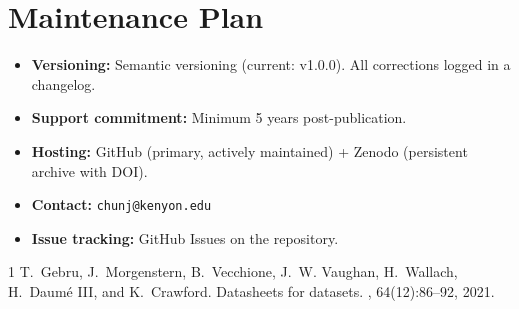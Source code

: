 \documentclass[11pt]{article}
\begin{document}
\section{Maintenance Plan}

\begin{itemize}[leftmargin=*]
    \item \textbf{Versioning:} Semantic versioning (current: v1.0.0). All corrections logged in a changelog.
    \item \textbf{Support commitment:} Minimum 5 years post-publication.
    \item \textbf{Hosting:} GitHub (primary, actively maintained) + Zenodo (persistent archive with DOI).
    \item \textbf{Contact:} \texttt{chunj@kenyon.edu}
    \item \textbf{Issue tracking:} GitHub Issues on the repository.
\end{itemize}

\begin{thebibliography}{1}
T.~Gebru, J.~Morgenstern, B.~Vecchione, J.~W. Vaughan, H.~Wallach, H.~{Daum\'{e} III}, and K.~Crawford.
\newblock Datasheets for datasets.
, 64(12):86--92, 2021.
\end{thebibliography}
\end{document}
